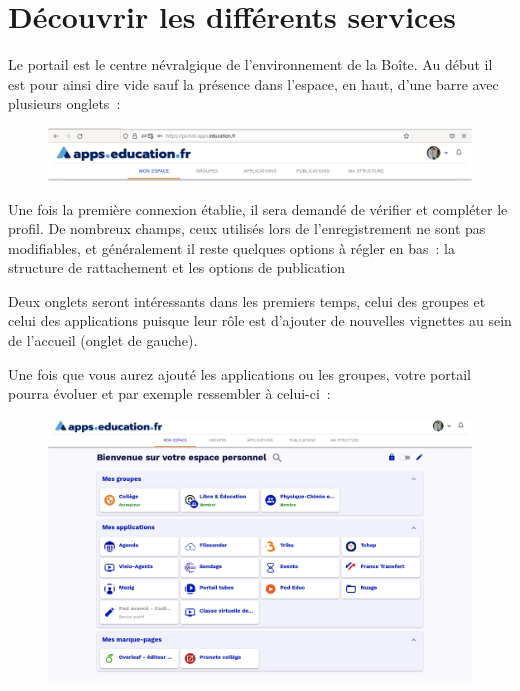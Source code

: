 \chapter{Découvrir les différents services}

Le portail est le centre névralgique de l'environnement de la Boîte. 
Au début il est pour ainsi dire vide sauf la présence dans l'espace, en haut, d'une barre avec plusieurs onglets~:
\begin{figure}
	\centering
	\includegraphics[width=\linewidth]{./Captures/portail.barre.haute.png}
\end{figure}
Une fois la première connexion établie, il sera demandé de vérifier et compléter le profil. 
De nombreux champs, ceux utilisés lors de l'enregistrement ne sont pas modifiables, et généralement il reste quelques options à régler en bas~: la structure de rattachement et les options de publication

Deux onglets seront intéressants dans les premiers temps, celui des groupes et celui des applications puisque leur rôle est d'ajouter de nouvelles vignettes au sein de l'accueil (onglet de gauche).

Une fois que vous aurez ajouté les applications ou les groupes, votre portail pourra évoluer et par exemple ressembler à celui-ci~:
\begin{figure}
	\centering
	\includegraphics[width=\linewidth]{./Captures/portail.accueil.png}
\end{figure}

